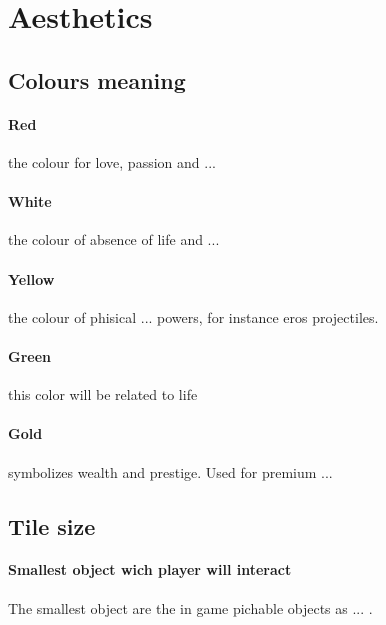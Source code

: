 %
%
%


\section{\projectname \space  Aesthetics}

\subsection{Colours meaning}
\paragraph{Red} the colour for love, passion and ...
\paragraph{White} the colour of absence of life and ...
\paragraph{Yellow} the colour of phisical ... powers, for instance
eros projectiles.
\paragraph{Green} this color will be related to life
\paragraph{Gold} symbolizes wealth and prestige. Used for premium ...


\subsection{Tile size}
\paragraph{Smallest object wich player will interact}
The smallest object are the in game pichable objects as ... .
